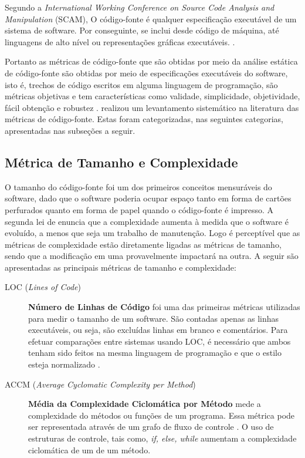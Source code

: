 Segundo a \textit{International Working Conference on Source Code Analysis and 
Manipulation} (SCAM), O código-fonte é qualquer especificação executável 
de um sistema de software. Por conseguinte, se inclui desde código de máquina, 
até linguagens de alto nível ou representações gráficas executáveis. 
\cite{harman2010source}. 


Portanto as métricas de código-fonte que são obtidas por meio da análise estática de código-fonte são obtidas por meio de especificações executáveis do software, isto é, trechos de código escritos em alguma linguagem de programação, são métricas objetivas e tem características como validade, simplicidade, objetividade, fácil obtenção e robustez \cite{Mills:1999}.  realizou um levantamento sistemático na literatura das métricas de código-fonte. Estas foram categorizadas, nas seguintes categorias, apresentadas nas subseções a seguir. 


\subsection{Métrica de Tamanho e Complexidade}

\label{métricas tamanho e complexidade} 

O tamanho do código-fonte foi um dos primeiros conceitos mensuráveis do 
software, dado que o software poderia ocupar espaço tanto em forma de cartões 
perfurados quanto em forma de papel quando o código-fonte é impresso. 
A segunda lei de  enuncia que a complexidade aumenta à 
medida que o software é evoluído, a menos que seja um trabalho de manutenção. 
Logo é perceptível que as métricas de complexidade estão diretamente ligadas as 
métricas de tamanho, sendo que a modificação em uma provavelmente impactará na 
outra. A seguir são apresentadas as principais métricas de tamanho e 
complexidade:


\begin{description}

	\item[LOC (\textit{Lines of Code})] \textbf{Número de Linhas de Código} 
	foi uma das primeiras métricas utilizadas para medir o tamanho de um 
	software. São contadas apenas as linhas executáveis, ou seja, são excluídas 
	linhas em branco e comentários. Para efetuar comparações entre sistemas 
	usando LOC, é necessário que ambos tenham sido feitos na mesma linguagem de 
	programação e que o estilo esteja normalizado \cite{Jones91}.
	
	\item[ACCM (\textit{Average Cyclomatic Complexity per Method})] \textbf{
	Média da Complexidade Ciclomática por Método} mede a complexidade do 
	métodos ou funções de um programa. Essa métrica pode ser representada 
	através de um grafo de fluxo de controle \cite{McCabe76}. O uso de 
	estruturas de controle, tais como, \textit{if, else, while} aumentam a 
	complexidade ciclomática de um de um método.

\end{description}




